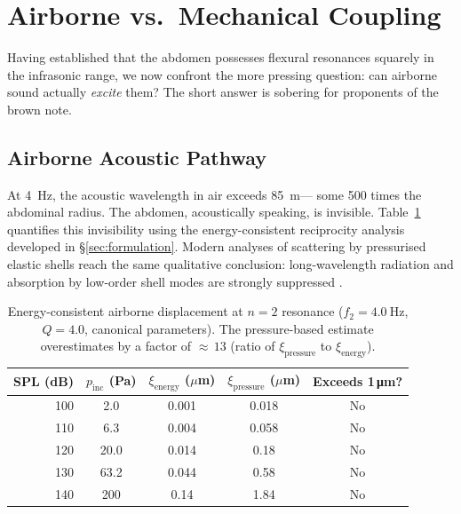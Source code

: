 \section{Airborne vs.\ Mechanical Coupling}\label{sec:coupling}

Having established that the abdomen possesses flexural resonances squarely
in the infrasonic range, we now confront the more pressing question: can
airborne sound actually \emph{excite} them?  The short answer is sobering
for proponents of the brown note.

\subsection{Airborne Acoustic Pathway}

At \SI{4}{\hertz}, the acoustic wavelength in air exceeds \SI{85}{\metre}---
some 500 times the abdominal radius.  The abdomen, acoustically speaking,
is invisible.  Table~\ref{tab:airborne} quantifies this
invisibility using the energy-consistent reciprocity analysis developed in
\S\ref{sec:formulation}.  Modern analyses of scattering by pressurised elastic
shells reach the same qualitative conclusion: long-wavelength radiation and
absorption by low-order shell modes are strongly suppressed
\cite{Godin2023}.

\begin{table}[htbp]
  \centering
  \caption{Energy-consistent airborne displacement at $n=2$ resonance
  ($f_2 = \SI{4.0}{\hertz}$, $Q = 4.0$, canonical parameters).
  The pressure-based estimate overestimates by a factor of ${\approx}\,13$
  (ratio of $\xi_\mathrm{pressure}$ to $\xi_\mathrm{energy}$).}
  \label{tab:airborne}
  \begin{tabular}{rcccc}
    \toprule
    SPL (dB) & $p_\mathrm{inc}$ (Pa) &
    $\xi_\mathrm{energy}$ ($\mu$m) &
    $\xi_\mathrm{pressure}$ ($\mu$m) & Exceeds 1\,\si{\micro\metre}? \\
    \midrule
    100 & 2.0  & 0.001 & 0.018 & No \\
    110 & 6.3  & 0.004 & 0.058 & No \\
    120 & 20.0 & 0.014 & 0.18  & No \\
    130 & 63.2 & 0.044 & 0.58  & No \\
    140 & 200  & 0.14  & 1.84  & No \\
    \bottomrule
  \end{tabular}
\end{table}

